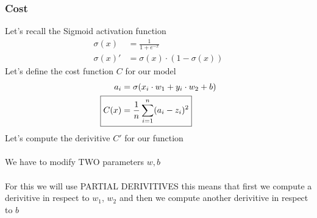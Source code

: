 \documentclass{article}
\begin{document}
\subsubsection{Cost}
Let's recall the Sigmoid activation function  
\begin{align}
    \sigma(x)  &= \frac{1}{1 + e^{-x}} \\ 
    \sigma(x)' &= \sigma(x) \cdot (1 - \sigma(x)) 
\end{align}
Let's define the cost function $C$ for our model
\begin{align}
    a_i  &= \sigma(x_i \cdot w_1 + y_i \cdot w_2 + b) \\ 
    \Aboxed{C(x) &= \avgsum[i, n](a_i - z_i)^2}
\end{align}
Let's compute the derivitive $C'$ for our function\\
\\
We have to modify TWO parameters $w, b$\\
\\
For this we will use PARTIAL DERIVITIVES this means that first we compute a derivitive in respect to $w_1$, $w_2$ and then we compute another derivitive in respect to $b$ \\
\def\pd[#1]{\partial_{#1}}
\end{document}
